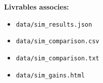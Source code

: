 \documentclass[12pt,a4paper]{article}
\begin{document}
\vspace{0.6em}
\noindent\textbf{Livrables associes:}
\begin{itemize}
    \item \texttt{data/sim\_results.json}
    \item \texttt{data/sim\_comparison.csv}
    \item \texttt{data/sim\_comparison.txt}
    \item \texttt{data/sim\_gains.html}
\end{itemize}
\end{document}
